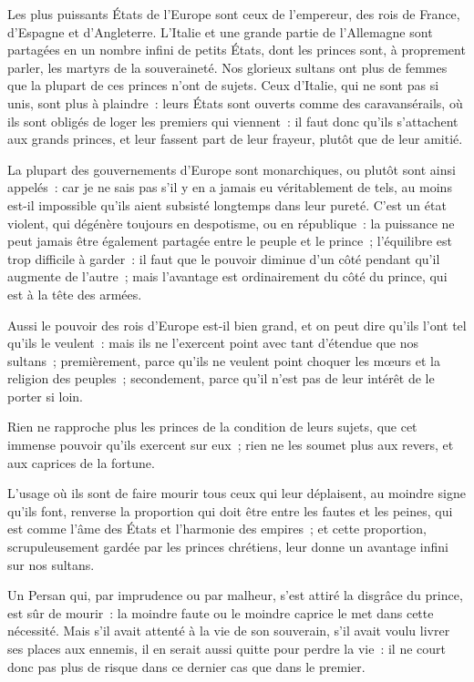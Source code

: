 \documentclass[french,twoside]{book} %
\begin{document}
\noindent Les plus puissants États de l’Europe sont ceux de l’empereur, des rois de France, d’Espagne et d’Angleterre. L’Italie et une grande partie de l’Allemagne sont partagées en un nombre infini de petits États, dont les princes sont, à proprement parler, les martyrs de la souveraineté. Nos glorieux sultans ont plus de femmes que la plupart de ces princes n’ont de sujets. Ceux d’Italie, qui ne sont pas si unis, sont plus à plaindre : leurs États sont ouverts comme des caravansérails, où ils sont obligés de loger les premiers qui viennent : il faut donc qu’ils s’attachent aux grands princes, et leur fassent part de leur frayeur, plutôt que de leur amitié.\par
La plupart des gouvernements d’Europe sont monarchiques, ou plutôt sont ainsi appelés : car je ne sais pas s’il y en a jamais eu véritablement de tels, au moins est-il impossible qu’ils aient subsisté longtemps dans leur pureté. C’est un état violent, qui dégénère toujours en despotisme, ou en république : la puissance ne peut jamais être également partagée entre le peuple et le prince ; l’équilibre est trop difficile à garder : il faut que le pouvoir diminue d’un côté pendant qu’il augmente de l’autre ; mais l’avantage est ordinairement du côté du prince, qui est à la tête des armées.\par
Aussi le pouvoir des rois d’Europe est-il bien grand, et on peut dire qu’ils l’ont tel qu’ils le veulent : mais ils ne l’exercent point avec tant d’étendue que nos sultans ; premièrement, parce qu’ils ne veulent point choquer les mœurs et la religion des peuples ; secondement, parce qu’il n’est pas de leur intérêt de le porter si loin.\par
Rien ne rapproche plus les princes de la condition de leurs sujets, que cet immense pouvoir qu’ils exercent sur eux ; rien ne les soumet plus aux revers, et aux caprices de la fortune.\par
L’usage où ils sont de faire mourir tous ceux qui leur déplaisent, au moindre signe qu’ils font, renverse la proportion qui doit être entre les fautes et les peines, qui est comme l’âme des États et l’harmonie des empires ; et cette proportion, scrupuleusement gardée par les princes chrétiens, leur donne un avantage infini sur nos sultans.\par
Un Persan qui, par imprudence ou par malheur, s’est attiré la disgrâce du prince, est sûr de mourir : la moindre faute ou le moindre caprice le met dans cette nécessité. Mais s’il avait attenté à la vie de son souverain, s’il avait voulu livrer ses places aux ennemis, il en serait aussi quitte pour perdre la vie : il ne court donc pas plus de risque dans ce dernier cas que dans le premier.\par
\end{document}
